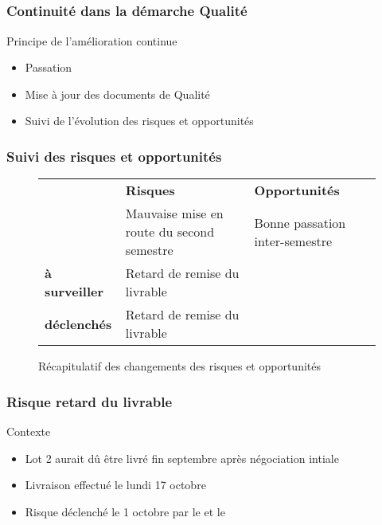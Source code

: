 
\speaker{\Kafui}

\subsection{} %


\begin{frame}
\frametitle{Continuité dans la démarche Qualité}
\begin{block}{Principe de l'amélioration continue}
\begin{itemize}
\item Passation 
\item Mise à jour des documents de Qualité
\item Suivi de l'évolution des risques et opportunités
\end{itemize}
\end{block}
\end{frame}




\begin{frame}
\frametitle{Suivi des risques et opportunités}
\begin{figure}
\begin{longtable}{|p{1.8cm}||p{3.5cm}|p{3.5cm}|}
\hline
 & \textbf{Risques} & \textbf{Opportunités} \\\hhline{|=||=|=|}
\multirow{1}{*}{\textbf{clôturés}} & \small Mauvaise mise en route du second semestre & \small Bonne passation inter-semestre \\\hline
\multirow{1}{*}{\textbf{à surveiller}} & \small Retard de remise du livrable & \\\hline
\multirow{1}{*}{\textbf{déclenchés}} & \small Retard de remise du livrable & \\\hline
\end{longtable}
\caption{Récapitulatif des changements des risques et opportunités}
\end{figure}
\end{frame}



\begin{frame}
\frametitle{Risque retard du livrable}
\begin{block}{Contexte}
\begin{itemize}
\item Lot 2 aurait dû être livré fin septembre après négociation intiale
\item Livraison effectué le lundi 17 octobre
\item Risque déclenché le 1 octobre par le \RQ{} et le \CP{}
\end{itemize}
\end{block}
\end{frame}

